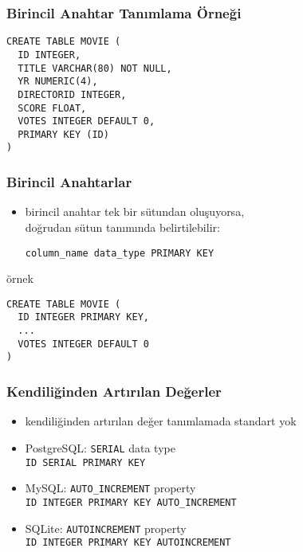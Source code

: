 \documentclass[dvipsnames]{beamer}
\theoremstyle{plain}
\begin{document}
\begin{frame}[fragile]
  \frametitle{Birincil Anahtar Tanımlama Örneği}

  \begin{lstlisting}
CREATE TABLE MOVIE (
  ID INTEGER,
  TITLE VARCHAR(80) NOT NULL,
  YR NUMERIC(4),
  DIRECTORID INTEGER,
  SCORE FLOAT,
  VOTES INTEGER DEFAULT 0,
  PRIMARY KEY (ID)
)
  \end{lstlisting}
\end{frame}

\begin{frame}[fragile]
  \frametitle{Birincil Anahtarlar}

  \begin{itemize}
    \item birincil anahtar tek bir sütundan oluşuyorsa,\\
        doğrudan sütun tanımında belirtilebilir:
    \begin{lstlisting}
column_name data_type PRIMARY KEY
    \end{lstlisting}
  \end{itemize}

  \begin{exampleblock}{örnek}
    \begin{lstlisting}
CREATE TABLE MOVIE (
  ID INTEGER PRIMARY KEY,
  ...
  VOTES INTEGER DEFAULT 0
)
    \end{lstlisting}
  \end{exampleblock}
\end{frame}

\begin{frame}[fragile]
  \frametitle{Kendiliğinden Artırılan Değerler}

  \begin{itemize}
    \item kendiliğinden artırılan değer tanımlamada standart yok
  
    \bigskip
      \item PostgreSQL: \texttt{SERIAL} data type\\
      \lstinline!ID SERIAL PRIMARY KEY!

    \smallskip
    \item MySQL: \texttt{AUTO\_INCREMENT} property\\
      \lstinline!ID INTEGER PRIMARY KEY AUTO_INCREMENT!

    \smallskip
    \item SQLite: \texttt{AUTOINCREMENT} property\\
      \lstinline!ID INTEGER PRIMARY KEY AUTOINCREMENT!
  \end{itemize}
\end{frame}
\end{document}
